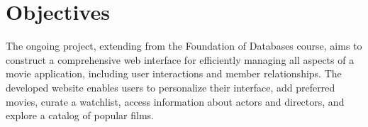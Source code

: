 \section{Objectives}


The ongoing project, extending from the Foundation of Databases course, aims to construct a comprehensive web interface for efficiently managing all aspects of a movie application, including user interactions and member relationships. The developed website enables users to personalize their interface, add preferred movies, curate a watchlist, access information about actors and directors, and explore a catalog of popular films.